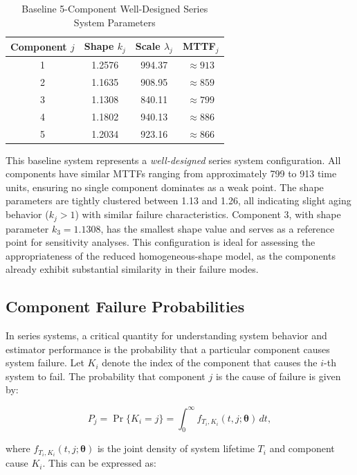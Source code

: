 \documentclass[11pt]{article}
\renewcommand{\v}[1]{\boldsymbol{#1}}
\begin{document}
\begin{table}[htbp]
\centering
\caption{Baseline 5-Component Well-Designed Series System Parameters}
\label{tab:series-sys}
\begin{tabular}{cccc}
\hline
Component $j$ & Shape $k_j$ & Scale $\lambda_j$ & MTTF$_j$ \\
\hline
1 & 1.2576 & 994.37 & $\approx 913$ \\
2 & 1.1635 & 908.95 & $\approx 859$ \\
3 & 1.1308 & 840.11 & $\approx 799$ \\
4 & 1.1802 & 940.13 & $\approx 886$ \\
5 & 1.2034 & 923.16 & $\approx 866$ \\
\hline
\end{tabular}
\end{table}

This baseline system represents a \emph{well-designed} series system configuration. All components have similar MTTFs ranging from approximately 799 to 913 time units, ensuring no single component dominates as a weak point. The shape parameters are tightly clustered between 1.13 and 1.26, all indicating slight aging behavior ($k_j > 1$) with similar failure characteristics. Component 3, with shape parameter $k_3 = 1.1308$, has the smallest shape value and serves as a reference point for sensitivity analyses. This configuration is ideal for assessing the appropriateness of the reduced homogeneous-shape model, as the components already exhibit substantial similarity in their failure modes.

\subsection{Component Failure Probabilities}

In series systems, a critical quantity for understanding system behavior and estimator performance is the probability that a particular component causes system failure. Let $K_i$ denote the index of the component that causes the $i$-th system to fail. The probability that component $j$ is the cause of failure is given by:

\begin{equation}
\label{eq:component_failure_prob}
P_j = \Pr\{K_i = j\} = \int_{0}^\infty f_{T_i, K_i}(t, j ; \v\theta) \, dt,
\end{equation}

\noindent where $f_{T_i, K_i}(t, j ; \v\theta)$ is the joint density of system lifetime $T_i$ and component cause $K_i$. This can be expressed as:
\end{document}
